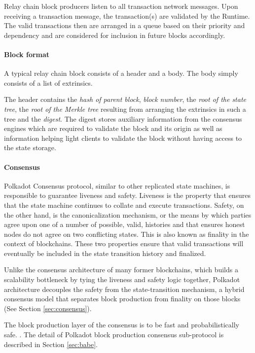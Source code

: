 Relay chain block producers listen to all transaction network messages. Upon receiving a transaction message, the transaction(s) are validated by the Runtime. The valid transactions then are arranged in a queue based on their priority and dependency and are considered for inclusion in future blocks accordingly.

\paragraph{Block format}
A typical relay chain block consists of a header and a body. The body simply consists of a list of extrinsics.

The header contains the \textit{hash of parent block}, \textit{block number}, the \textit{root of the state tree}, the \textit{root of the Merkle tree} resulting from arranging the extrinsics in such a tree and the \textit{digest}. The digest stores auxiliary information from the consensus engines which are required to validate the block and its origin as well as information helping light clients to validate the block without having access to the state storage.

\paragraph{Consensus}

Polkadot Consensus protocol, similar to other replicated state machines, is responsible to guarantee liveness and safety. Liveness is the property that ensures that the state machine continues to collate and execute transactions. Safety, on the other hand, is the canonicalization mechanism, or the means by which parties agree upon one of a number of possible, valid, histories and that ensures honest nodes do not agree on two conflicting states. This is also known as finality in the context of blockchains. These two properties ensure that valid transactions will eventually be included in the state transition
history and finalized.

Unlike the consensus architecture of many former blockchains, which builds a scalability bottleneck by tying the liveness and safety logic together, Polkadot architecture decouples the safety from the state-transition mechanism, a hybrid consensus model that separates block production from finality on those blocks (See Section \ref{sec:consensus}).

The block production layer of the consensus is to be fast and probabilistically safe. . The detail of Polkadot block production consensus sub-protocol is described in Section \ref{sec:babe}.

